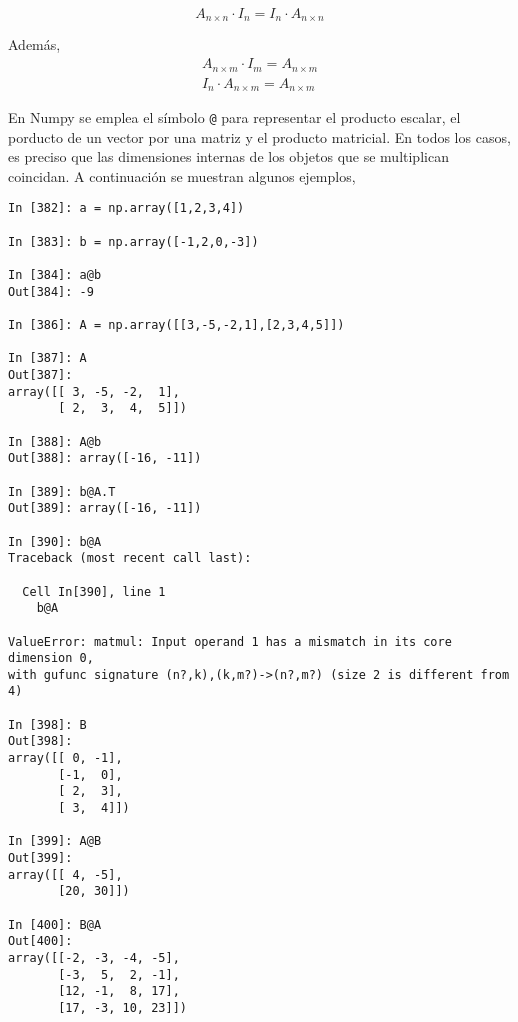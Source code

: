 \begin{equation*}
A_{n\times n}\cdot I_n=I_n\cdot A_{n\times n}
\end{equation*}

Además,
\begin{gather*}
A_{n\times m}\cdot I_m=A_{n \times m}\\
I_n\cdot A_{n\times m}=A_{n\times m}
\end{gather*}

\begin{paracol}{2}
En Numpy se emplea el símbolo \texttt{@} para representar el producto escalar, el porducto de un vector por una matriz y el producto matricial. En todos los casos, es preciso que las dimensiones internas de los objetos que se multiplican coincidan. A continuación se muestran algunos ejemplos,
\end{paracol}
\begin{center}
    \begin{minipage}{0.7\textwidth}
        \begin{verbatim}
In [382]: a = np.array([1,2,3,4])

In [383]: b = np.array([-1,2,0,-3])

In [384]: a@b
Out[384]: -9

In [386]: A = np.array([[3,-5,-2,1],[2,3,4,5]])

In [387]: A
Out[387]: 
array([[ 3, -5, -2,  1],
       [ 2,  3,  4,  5]])

In [388]: A@b
Out[388]: array([-16, -11])

In [389]: b@A.T
Out[389]: array([-16, -11])

In [390]: b@A
Traceback (most recent call last):

  Cell In[390], line 1
    b@A

ValueError: matmul: Input operand 1 has a mismatch in its core dimension 0, 
with gufunc signature (n?,k),(k,m?)->(n?,m?) (size 2 is different from 4)

In [398]: B
Out[398]: 
array([[ 0, -1],
       [-1,  0],
       [ 2,  3],
       [ 3,  4]])

In [399]: A@B
Out[399]: 
array([[ 4, -5],
       [20, 30]])

In [400]: B@A
Out[400]: 
array([[-2, -3, -4, -5],
       [-3,  5,  2, -1],
       [12, -1,  8, 17],
       [17, -3, 10, 23]])
        \end{verbatim}
    \end{minipage}
\end{center}

